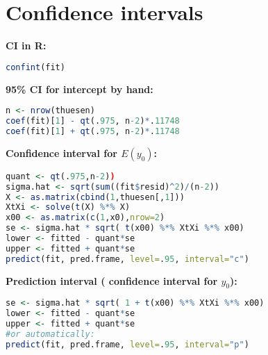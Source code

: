 \section{Confidence intervals}
\textbf{CI in R:} 
\begin{lstlisting}[language=R]
confint(fit)
\end{lstlisting}
\textbf{95\% CI for intercept by hand:} 
\begin{lstlisting}[language=R]
n <- nrow(thuesen)
coef(fit)[1] - qt(.975, n-2)*.11748
coef(fit)[1] + qt(.975, n-2)*.11748
\end{lstlisting}
\textbf{Confidence interval for $E(y_0)$:}
\begin{lstlisting}[language=R]
quant <- qt(.975,n-2))
sigma.hat <- sqrt(sum((fit$resid)^2)/(n-2))
X <- as.matrix(cbind(1,thuesen[,1]))
XtXi <- solve(t(X) %*% X)
x00 <- as.matrix(c(1,x0),nrow=2)
se <- sigma.hat * sqrt( t(x00) %*% XtXi %*% x00)
lower <- fitted - quant*se
upper <- fitted + quant*se
predict(fit, pred.frame, level=.95, interval="c")\end{lstlisting}
\textbf{Prediction interval ( confidence interval for $y_0$):}
\begin{lstlisting}[language = R]
se <- sigma.hat * sqrt( 1 + t(x00) %*% XtXi %*% x00)
lower <- fitted - quant*se
upper <- fitted + quant*se
#or automatically: 
predict(fit, pred.frame, level=.95, interval="p")
\end{lstlisting}